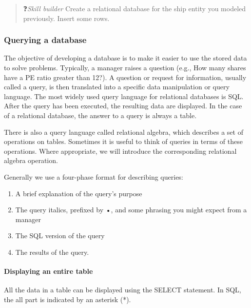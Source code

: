 \documentclass[
]{article}
\begin{document}
\begin{quote}
❓\emph{Skill builder} Create a relational database for the ship entity you modeled previously. Insert some rows.
\end{quote}

\hypertarget{querying-a-database}{%
\subsubsection*{Querying a database}\label{querying-a-database}}

The objective of developing a database is to make it easier to use the stored data to solve problems. Typically, a manager raises a question (e.g., How many shares have a PE ratio greater than 12?). A question or request for information, usually called a query, is then translated into a specific data manipulation or query language. The most widely used query language for relational databases is SQL. After the query has been executed, the resulting data are displayed. In the case of a relational database, the answer to a query is always a table.

There is also a query language called relational algebra, which describes a set of operations on tables. Sometimes it is useful to think of queries in terms of these operations. Where appropriate, we will introduce the corresponding relational algebra operation.

Generally we use a four-phase format for describing queries:

\begin{enumerate}
\def\labelenumi{\arabic{enumi}.}
\item
  A brief explanation of the query's purpose
\item
  The query italics, prefixed by •, and some phrasing you might expect from a manager
\item
  The SQL version of the query
\item
  The results of the query.
\end{enumerate}

\hypertarget{displaying-an-entire-table}{%
\paragraph*{Displaying an entire table}\label{displaying-an-entire-table}}

All the data in a table can be displayed using the SELECT statement. In SQL, the all part is indicated by an asterisk (*).
\end{document}
